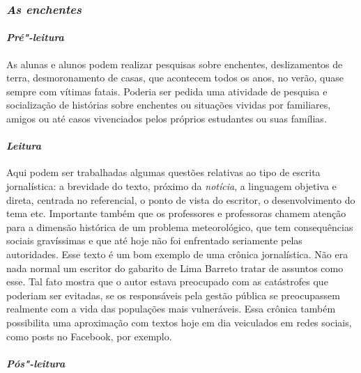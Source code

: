 \documentclass[11pt]{extarticle}
\begin{document}
\subsubsection{\textit{As enchentes}}
\paragraph{\textit{Pré"-leitura}}

As alunas e alunos podem realizar pesquisas sobre enchentes,
deslizamentos de terra, desmoronamento de casas, que acontecem todos os
anos, no verão, quase sempre com vítimas fatais. Poderia ser pedida uma
atividade de pesquisa e socialização de histórias sobre enchentes ou
situações vividas por familiares, amigos ou até casos vivenciados pelos
próprios estudantes ou suas famílias.






\paragraph{\textit{Leitura}}

Aqui podem ser trabalhadas algumas questões relativas ao tipo de
escrita jornalística: a brevidade do texto, próximo da \emph{notícia}, a
linguagem objetiva e direta, centrada no referencial, o ponto de vista
do escritor, o desenvolvimento do tema etc. Importante também que os
professores e professoras chamem atenção para a dimensão histórica de um
problema meteorológico, que tem consequências sociais gravíssimas e que
até hoje não foi enfrentado seriamente pelas autoridades. Esse texto é
um bom exemplo de uma crônica jornalística. Não era nada normal um
escritor do gabarito de Lima Barreto tratar de assuntos como esse. Tal
fato mostra que o autor estava preocupado com as catástrofes que
poderiam ser evitadas, se os responsáveis pela gestão pública se
preocupassem realmente com a vida das populações mais vulneráveis. Essa
crônica também possibilita uma aproximação com textos hoje em dia
veiculados em redes sociais, como posts no Facebook, por exemplo.

\paragraph{\textit{Pós"-leitura}}
\end{document}
